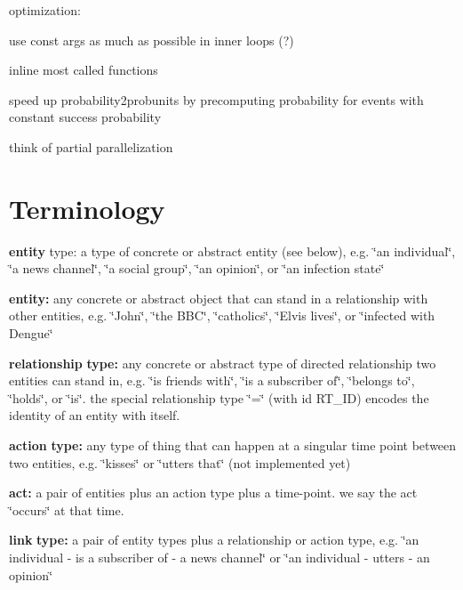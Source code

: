optimization\+:
\begin{DoxyItemize}
\item use const args as much as possible in inner loops (?)
\item inline most called functions
\item speed up probability2probunits by precomputing probability for events with constant success probability
\item think of partial parallelization
\end{DoxyItemize}

\section*{Terminology }


\begin{DoxyItemize}
\item {\bfseries entity} type\+: a type of concrete or abstract entity (see below), e.\+g. \char`\"{}an individual\char`\"{}, \char`\"{}a news channel\char`\"{}, \char`\"{}a social group\char`\"{}, \char`\"{}an opinion\char`\"{}, or \char`\"{}an infection state\char`\"{}
\item {\bfseries entity\+:} any concrete or abstract object that can stand in a relationship with other entities, e.\+g. \char`\"{}\+John\char`\"{}, \char`\"{}the B\+B\+C\char`\"{}, \char`\"{}catholics\char`\"{}, \char`\"{}\+Elvis lives\char`\"{}, or \char`\"{}infected with Dengue\char`\"{}
\item {\bfseries relationship} {\bfseries type\+:} any concrete or abstract type of directed relationship two entities can stand in, e.\+g. \char`\"{}is friends with\char`\"{}, \char`\"{}is a subscriber of\char`\"{}, \char`\"{}belongs to\char`\"{}, \char`\"{}holds\char`\"{}, or \char`\"{}is\char`\"{}. the special relationship type \char`\"{}=\char`\"{} (with id R\+T\+\_\+\+ID) encodes the identity of an entity with itself.
\item {\bfseries action} {\bfseries type\+:} any type of thing that can happen at a singular time point between two entities, e.\+g. \char`\"{}kisses\char`\"{} or \char`\"{}utters that\char`\"{} (not implemented yet)
\item {\bfseries act\+:} a pair of entities plus an action type plus a time-\/point. we say the act \char`\"{}occurs\char`\"{} at that time.
\item {\bfseries link} {\bfseries type\+:} a pair of entity types plus a relationship or action type, e.\+g. \char`\"{}an individual -\/ is a subscriber of -\/ a news channel\char`\"{} or \char`\"{}an individual -\/ utters -\/ an opinion\char`\"{}

\end{DoxyItemize}
